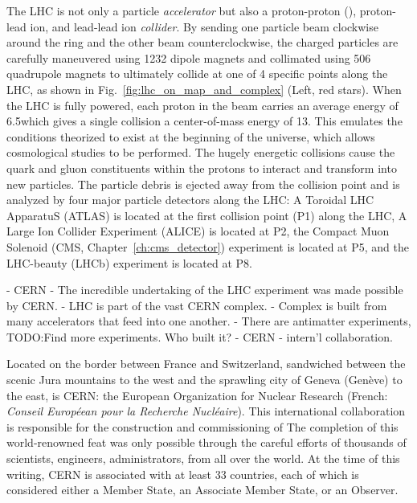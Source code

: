The LHC is not only a particle \emph{accelerator} but also a proton-proton (\pp), proton-lead ion, and lead-lead ion \emph{collider}.
By sending one particle beam clockwise around the ring and the other beam counterclockwise, the charged particles are carefully maneuvered using 1232 dipole magnets and collimated using 506 quadrupole magnets to ultimately collide at one of 4 specific points along the LHC, as shown in Fig.~\ref{fig:lhc_on_map_and_complex} (Left, red stars).
When the LHC is fully powered, each proton in the beam carries an average energy of 6.5\TeV which gives a single \pp collision a center-of-mass energy of 13\TeV.
This emulates the conditions theorized to exist at the beginning of the universe, which allows cosmological studies to be performed.
The hugely energetic \pp collisions cause the quark and gluon constituents within the protons to interact and transform into new particles.
The particle debris is ejected away from the collision point and is analyzed by four major particle detectors along the LHC:
A Toroidal LHC ApparatuS (ATLAS) is located at the first collision point (P1) along the LHC,
A Large Ion Collider Experiment (ALICE) is located at P2,
the Compact Muon Solenoid (CMS, Chapter~\ref{ch:cms_detector}) experiment is located at P5,
and the LHC-beauty (LHCb) experiment is located at P8.

- CERN
    - The incredible undertaking of the LHC experiment was made possible by CERN.
    - LHC is part of the vast CERN complex.
    - Complex is built from many accelerators that feed into one another.
    - There are antimatter experiments, TODO:Find more experiments.
    Who built it?
- CERN
- intern'l collaboration.

Located on the border between France and Switzerland, sandwiched between the scenic Jura mountains to the west and the sprawling city of Geneva (Genève) to the east, is CERN:
the European Organization for Nuclear Research (French: \emph{Conseil Européean pour la Recherche Nucléaire}).
This international collaboration is responsible for the construction and commissioning of
The completion of this world-renowned feat was only possible through the careful efforts of thousands of scientists, engineers, administrators, \etc from all over the world.
At the time of this writing, CERN is associated with at least 33 countries, each of which is considered either a Member State, an Associate Member State, or an Observer.

